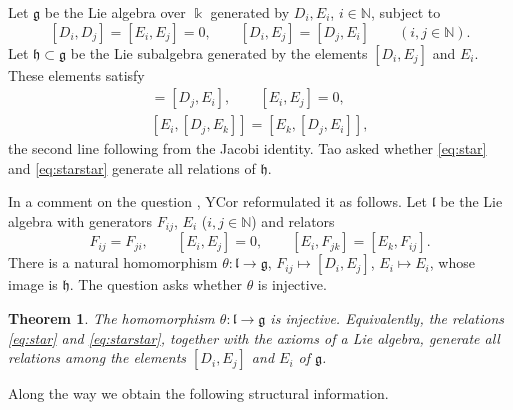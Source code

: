 \documentclass[11pt]{amsart}
\newtheorem{theorem}{Theorem}[section]
\theoremstyle{definition}
\theoremstyle{remark}
\newcommand{\N}{\mathbb{N}}
\newcommand{\kk}{\Bbbk}
\newcommand{\g}{\mathfrak{g}}
\newcommand{\h}{\mathfrak{h}}
\newcommand{\lie}{\mathfrak{l}}
\begin{document}
Let $\g$ be the Lie algebra over $\kk$ generated by $D_i,E_i$, $i\in\N$, subject to
\begin{equation}\label{eq:g}
[D_i,D_j]=[E_i,E_j]=0,\qquad [D_i,E_j]=[D_j,E_i]\qquad(i,j\in\N).
\end{equation}
Let $\h\subset\g$ be the Lie subalgebra generated by the elements $[D_i,E_j]$ and $E_i$. These elements satisfy
\begin{gather}
[D_i,E_j]=[D_j,E_i],\qquad [E_i,E_j]=0, \tag{$*$}\label{eq:star}\\
[E_i,[D_j,E_k]]=[E_k,[D_j,E_i]], \tag{$**$}\label{eq:starstar}
\end{gather}
the second line following from the Jacobi identity. Tao asked whether \eqref{eq:star} and \eqref{eq:starstar} generate all relations of $\h$.

In a comment on the question \cite{YCor}, YCor reformulated it as follows. Let $\lie$ be the Lie algebra with generators $F_{ij}$, $E_i$ ($i,j\in\N$) and relators
\begin{equation}\label{eq:l}
F_{ij}=F_{ji},\qquad [E_i,E_j]=0,\qquad [E_i,F_{jk}]=[E_k,F_{ij}].
\end{equation}
There is a natural homomorphism $\theta\colon\lie\to\g$, $F_{ij}\mapsto[D_i,E_j]$, $E_i\mapsto E_i$, whose image is $\h$. The question asks whether $\theta$ is injective.

\begin{theorem}\label{thm:main}
The homomorphism $\theta\colon\lie\to\g$ is injective. Equivalently, the relations \eqref{eq:star} and \eqref{eq:starstar}, together with the axioms of a Lie algebra, generate all relations among the elements $[D_i,E_j]$ and $E_i$ of $\g$.
\end{theorem}

Along the way we obtain the following structural information.
\end{document}
